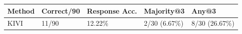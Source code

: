 \begin{tabular}{lllll}
\toprule
Method & Correct/90 & Response Acc. & Majority@3 & Any@3 \\
\midrule
KIVI & 11/90 & 12.22\% & 2/30 (6.67\%) & 8/30 (26.67\%) \\
\bottomrule
\end{tabular}
